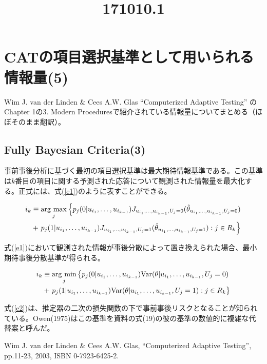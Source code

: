 \documentclass[a4j]{jarticle}
\date{}
\title{171010.1}
\begin{document}
\maketitle

\section{CATの項目選択基準として用いられる情報量(5)}
Wim J. van der Linden \& Cees A.W. Glas ``Computerized Adaptive Testing'' \cite{b1}のChapter 1の3. Modern Proceduresで紹介されている情報量についてまとめる（ほぼそのまま翻訳）。

\subsection{Fully Bayesian Criteria(3)}
事前事後分析に基づく最初の項目選択基準は最大期待情報基準である。この基準は$k$番目の項目に関する予測された応答について観測された情報量を最大化する。正式には、式(\ref{e1})のように表すことができる。

\newcommand{\argmax}{\mathop{\rm arg~max}\limits}
\begin{eqnarray}
\begin{split}
  \label{e1}
  i_{k} &\equiv \argmax_{j}\left\{p_{j}(0|u_{i_{1}},\ldots,u_{i_{k-1}})J_{u_{i_{1}},\ldots,u_{i_{k-1}},U_{j}=0}(\hat{\theta}_{u_{i_{1}},\ldots,u_{i_{k-1}},U_{j}=0})\right.\\
  &+\left.p_{j}(1|u_{i_{1}},\ldots,u_{i_{k-1}})J_{u_{i_{1}},\ldots,u_{i_{k-1}},U_{j}=1}(\hat{\theta}_{u_{i_{1}},\ldots,u_{i_{k-1}},U_{j}=1}):j\in R_{k}\right\}
\end{split}
\end{eqnarray}

式(\ref{e1})において観測された情報が事後分散によって置き換えられた場合、最小期待事後分散基準が得られる。

\newcommand{\argmin}{\mathop{\rm arg~min}\limits}
\begin{eqnarray}
\begin{split}
  \label{e2}
  i_{k} &\equiv \argmin_{j}\left\{p_{j}(0|u_{i_{1}},\ldots,u_{i_{k-1}}){\rm Var}(\theta|u_{i_{1}},\ldots,u_{i_{k-1}},U_{j}=0)\right.\\
  &+\left.p_{j}(1|u_{i_{1}},\ldots,u_{i_{k-1}}){\rm Var}(\theta|u_{i_{1}},\ldots,u_{i_{k-1}},U_{j}=1):j\in R_{k}\right\}
\end{split}
\end{eqnarray}

式(\ref{e2})は、推定器の二次の損失関数の下で事前事後リスクとなることが知られている。Owen(1975)はこの基準を{資料の式(19)}の彼の基準の数値的に複雑な代替案と呼んだ。

\begin{thebibliography}{9}
   Wim J. van der Linden \& Cees A.W. Glas, ``Computerized Adaptive Testing'', pp.11-23, 2003, ISBN 0-7923-6425-2.
\end{thebibliography}
\end{document}
